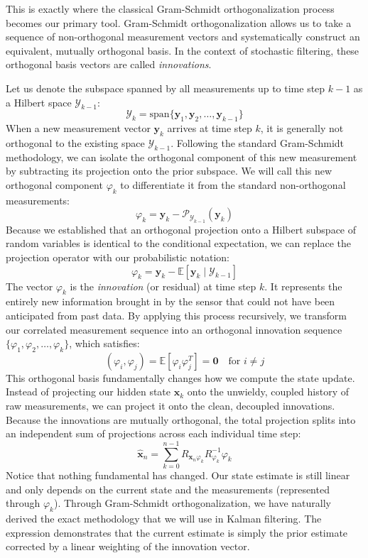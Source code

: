 This is exactly where the classical Gram-Schmidt orthogonalization process becomes our primary tool. Gram-Schmidt orthogonalization allows us to take a sequence of non-orthogonal measurement vectors and systematically construct an equivalent, mutually orthogonal basis. In the context of stochastic filtering, these orthogonal basis vectors are called \textit{innovations}.

Let us denote the subspace spanned by all measurements up to time step $k-1$ as a Hilbert space $\mathcal{Y}_{k-1}$:
\begin{equation}
\mathcal{Y}_{k} = \text{span}\{\bm{y}_1, \bm{y}_2, \dots, \bm{y}_{k-1}\}
\end{equation}
When a new measurement vector $\bm{y}_k$ arrives at time step $k$, it is generally not orthogonal to the existing space $\mathcal{Y}_{k-1}$. Following the standard Gram-Schmidt methodology, we can isolate the orthogonal component of this new measurement by subtracting its projection onto the prior subspace. We will call this new orthogonal component $\varphi_k$ to differentiate it from the standard non-orthogonal measurements:
\begin{equation}
\varphi_k = \bm{y}_k - \mathcal{P}_{\mathcal{Y}_{k-1}}(\bm{y}_k)
\end{equation}
Because we established that an orthogonal projection onto a Hilbert subspace of random variables is identical to the conditional expectation, we can replace the projection operator with our probabilistic notation:
\begin{equation}
\varphi_k = \bm{y}_k - \mathbb{E}[\bm{y}_k \mid \mathcal{Y}_{k-1}]
\end{equation}
The vector $\varphi_k$ is the \textit{innovation} (or residual) at time step $k$. It represents the entirely new information brought in by the sensor that could not have been anticipated from past data. By applying this process recursively, we transform our correlated measurement sequence into an orthogonal innovation sequence $\{\varphi_1, \varphi_2, \dots, \varphi_k\}$, which satisfies:
\begin{equation}
( \varphi_i, \varphi_j )= \mathbb{E}[\varphi_i \varphi_j^T] = \bm{0} \quad \text{for } i \neq j
\end{equation}
This orthogonal basis fundamentally changes how we compute the state update. Instead of projecting our hidden state $\bm{x}_k$ onto the unwieldy, coupled history of raw measurements, we can project it onto the clean, decoupled innovations. Because the innovations are mutually orthogonal, the total projection splits into an independent sum of projections across each individual time step:
$$\bm{\hat{x}}_n=\sum_{k=0}^{n-1}R_{\bm{x}_n \varphi_k} R_{\varphi_{k}}^{-1}\varphi_k$$
Notice that nothing fundamental has changed. Our state estimate is still linear and only depends on the current state and the measurements (represented through $\varphi_k$). Through Gram-Schmidt orthogonalization, we have naturally derived the exact methodology that we will use in Kalman filtering. The expression demonstrates that the current estimate is simply the prior estimate corrected by a linear weighting of the innovation vector.

